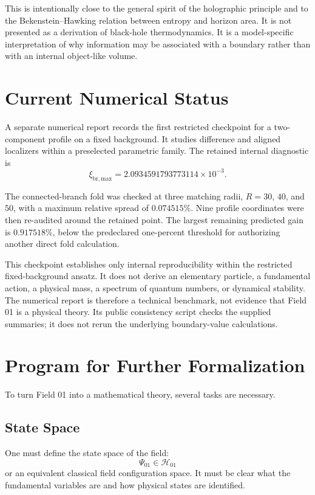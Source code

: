 \documentclass[11pt,a4paper]{article}
\begin{document}
This is intentionally close to the general spirit of the holographic principle and to the Bekenstein--Hawking relation between entropy and horizon area. It is not presented as a derivation of black-hole thermodynamics. It is a model-specific interpretation of why information may be associated with a boundary rather than with an internal object-like volume.

\section{Current Numerical Status}

A separate numerical report records the first restricted checkpoint for a two-component profile on a fixed background. It studies difference and aligned localizers within a preselected parametric family. The retained internal diagnostic is
\begin{equation}
\xi_{\mathrm{br,max}}=2.0934591793773114\times10^{-3}.
\end{equation}

The connected-branch fold was checked at three matching radii, $R=30$, $40$, and $50$, with a maximum relative spread of $0.074515\%$. Nine profile coordinates were then re-audited around the retained point. The largest remaining predicted gain is $0.917518\%$, below the predeclared one-percent threshold for authorizing another direct fold calculation.

This checkpoint establishes only internal reproducibility within the restricted fixed-background ansatz. It does not derive an elementary particle, a fundamental action, a physical mass, a spectrum of quantum numbers, or dynamical stability. The numerical report is therefore a technical benchmark, not evidence that Field 01 is a physical theory. Its public consistency script checks the supplied summaries; it does not rerun the underlying boundary-value calculations.

\section{Program for Further Formalization}

To turn Field 01 into a mathematical theory, several tasks are necessary.

\subsection*{State Space}

One must define the state space of the field:
\begin{equation}
\Psi_{01} \in \mathcal{H}_{01}
\end{equation}
or an equivalent classical field configuration space. It must be clear what the fundamental variables are and how physical states are identified.
\end{document}

